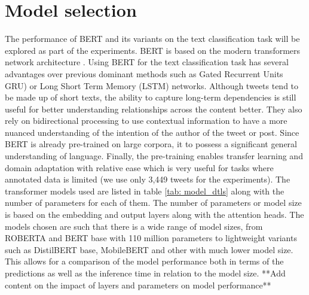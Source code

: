 \section{Model selection}
The performance of BERT and its variants on the text classification task will be explored as part of the experiments. BERT \cite{devlinBERTPretrainingDeep2018} is based on the modern transformers network architecture \cite{vaswaniAttentionAllYou2023a}. Using BERT for the text classification task has several advantages over previous dominant methods such as Gated Recurrent Units GRU) \cite{chungEmpiricalEvaluationGated2014} or Long Short Term Memory (LSTM) \cite{hochreiterLongShortTermMemory1997} networks. Although tweets tend to be made up of short texts, the ability to capture long-term dependencies is still useful for better understanding relationships across the content better. They also rely on bidirectional processing to use contextual information to have a more nuanced understanding of the intention of the author of the tweet or post. Since BERT is already pre-trained on large corpora, it to possess a significant general understanding of language. Finally, the pre-training enables transfer learning and domain adaptation with relative ease which is very useful for tasks where annotated data is limited (we use only 3,449 tweets for the experiments).
\newline\newline
The transformer models used are listed in table \ref{tab: model_dtls} along with the number of parameters for each of them. The number of parameters or model size is based on the embedding and output layers along with the attention heads. The models chosen are such that there is a wide range of model sizes, from ROBERTA and BERT base with 110 million parameters to lightweight variants such as DistilBERT base, MobileBERT and other with much lower model size. This allows for a comparison of the model performance both in terms of the predictions as well as the inference time in relation to the model size. **Add content on the impact of layers and parameters on model performance**

